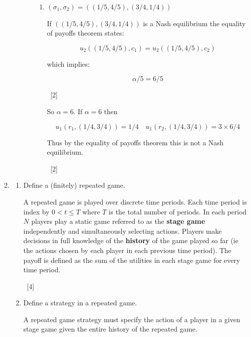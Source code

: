 \documentclass[12pt,a4paper]{article}
\begin{document}
\begin{enumerate}
\begin{enumerate}
\begin{enumerate}
\begin{enumerate}
                    \item \((\sigma_1, \sigma_2) = ((1/5,4/5), (3/4,1/4))\)

                    If \(((1/5,4/5), (3/4,1/4))\) is a Nash equilibrium the
                    equality of payoffs theorem states:

                    \[u_2((1/5,4/5),c_1)=u_2((1/5,4/5),c_2)\]

                    which implies:

                    \[\alpha/5=6/5\]

                    ~\hfill{[2]}

                    So \(\alpha=6\). If \(\alpha=6\) then

                    \[u_1(r_1, (1/4,3/4))=1/4\quad u_1(r_2, (1/4,3/4))=3\times6/4\]

                    Thus by the equality of payoffs theorem this is not a Nash
                    equilibrium.

                    ~\hfill{[2]}
                \end{enumerate}


            \end{enumerate}


    \end{enumerate}

\newpage
\item

    \begin{enumerate}
        \item Define a (finitely) repeated game.

            A repeated game is played over discrete time periods. Each time
            period is index by \(0<t\leq T\) where \(T\) is the total number of
            periods.  In each period \(N\) players play a static game referred
            to as the \textbf{stage game} independently and simultaneously
            selecting actions.  Players make decisions in full knowledge of the
            \textbf{history} of the game played so far (ie the actions chosen by
            each player in each previous time period).  The payoff is defined as
            the sum of the utilities in each stage game for every time period.

        ~\hfill[4]

        \item Define a strategy in a repeated game.

            A repeated game strategy must specify the action of a player in a given stage
            game given the entire history of the repeated game.


\end{enumerate}
\end{enumerate}
\end{document}
